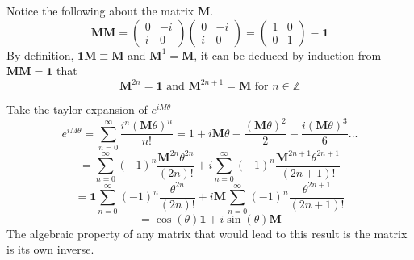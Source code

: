 \begin{sol}
Notice the following about the matrix $\mathbf{M}$.
\begin{equation}
	\mathbf{MM}=\begin{pmatrix}0 & -i\\i&0\end{pmatrix}\begin{pmatrix}0 & -i\\i&0\end{pmatrix}=\begin{pmatrix}
1&0\\0&1
\end{pmatrix}\equiv\mathbf{1}
\end{equation} 
By definition, $\mathbf{1M}\equiv\mathbf{M}$ and $\mathbf{M}^1=\mathbf{M}$, it can be deduced by induction from $\mathbf{MM}=\mathbf{1}$ that
\begin{equation}
	\mathbf{M}^{2n}=\mathbf{1} \text{ and } \mathbf{M}^{2n+1}=\mathbf{M}\text{ for }n\in\mathbb{Z}
\end{equation}

Take the taylor expansion of $e^{iM\theta}$
\begin{equation}
	e^{iM\theta}=\sum_{n=0}^\infty\frac{i^n(\mathbf{M}\theta)^n}{n!}=1+i\mathbf{M}\theta-\frac{(\mathbf{M}\theta)^2}{2}-\frac{i(\mathbf{M}\theta)^3}{6}...
\end{equation} 
\begin{equation}
	=\sum_{n=0}^\infty(-1)^n\frac{\mathbf{M}^{2n}\theta^{2n}}{(2n)!}+i\sum_{n=0}^\infty(-1)^n\frac{\mathbf{M}^{2n+1}\theta^{2n+1}}{(2n+1)!}
\end{equation}
\begin{equation}
	=\mathbf{1}\sum_{n=0}^\infty(-1)^n\frac{\theta^{2n}}{(2n)!}+i\mathbf{M}\sum_{n=0}^\infty(-1)^n\frac{\theta^{2n+1}}{(2n+1)!}
\end{equation}
\begin{equation}
	=\cos(\theta)\mathbf{1}+i\sin(\theta)\mathbf{M}
\end{equation}
The algebraic property of any matrix that would lead to this result is the matrix is its own inverse.
\end{sol}